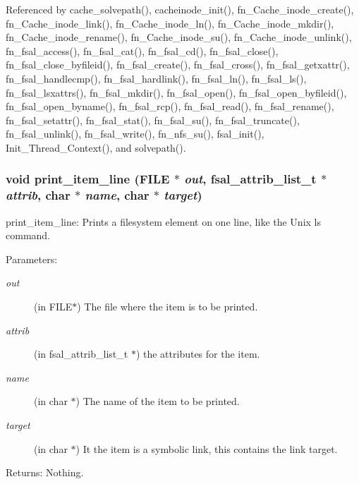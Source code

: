 Referenced by cache\_\-solvepath(), cacheinode\_\-init(), fn\_\-Cache\_\-inode\_\-create(), fn\_\-Cache\_\-inode\_\-link(), fn\_\-Cache\_\-inode\_\-ln(), fn\_\-Cache\_\-inode\_\-mkdir(), fn\_\-Cache\_\-inode\_\-rename(), fn\_\-Cache\_\-inode\_\-su(), fn\_\-Cache\_\-inode\_\-unlink(), fn\_\-fsal\_\-access(), fn\_\-fsal\_\-cat(), fn\_\-fsal\_\-cd(), fn\_\-fsal\_\-close(), fn\_\-fsal\_\-close\_\-byfileid(), fn\_\-fsal\_\-create(), fn\_\-fsal\_\-cross(), fn\_\-fsal\_\-getxattr(), fn\_\-fsal\_\-handlecmp(), fn\_\-fsal\_\-hardlink(), fn\_\-fsal\_\-ln(), fn\_\-fsal\_\-ls(), fn\_\-fsal\_\-lsxattrs(), fn\_\-fsal\_\-mkdir(), fn\_\-fsal\_\-open(), fn\_\-fsal\_\-open\_\-byfileid(), fn\_\-fsal\_\-open\_\-byname(), fn\_\-fsal\_\-rcp(), fn\_\-fsal\_\-read(), fn\_\-fsal\_\-rename(), fn\_\-fsal\_\-setattr(), fn\_\-fsal\_\-stat(), fn\_\-fsal\_\-su(), fn\_\-fsal\_\-truncate(), fn\_\-fsal\_\-unlink(), fn\_\-fsal\_\-write(), fn\_\-nfs\_\-su(), fsal\_\-init(), Init\_\-Thread\_\-Context(), and solvepath().
\subsubsection{\setlength{\rightskip}{0pt plus 5cm}void print\_\-item\_\-line (FILE $\ast$ {\em out}, fsal\_\-attrib\_\-list\_\-t $\ast$ {\em attrib}, char $\ast$ {\em name}, char $\ast$ {\em target})}\label{cmd__tools_8c_a17}


print\_\-item\_\-line: Prints a filesystem element on one line, like the Unix ls command.

\begin{Desc}
\item[Parameters:]
\begin{description}
\item[{\em out}](in FILE$\ast$) The file where the item is to be printed. \item[{\em attrib}](in fsal\_\-attrib\_\-list\_\-t $\ast$) the attributes for the item. \item[{\em name}](in char $\ast$) The name of the item to be printed. \item[{\em target}](in char $\ast$) It the item is a symbolic link, this contains the link target. \end{description}
\end{Desc}
\begin{Desc}
\item[Returns:]Nothing. \end{Desc}


